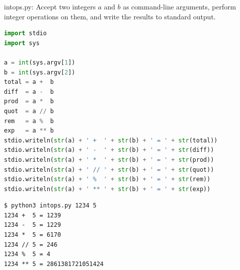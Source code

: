 \documentclass[8pt,a4paper,compress]{beamer}
\begin{document}
\begin{frame}[fragile]
\pause

\begin{framed}
\tiny intops.py: Accept two integers $a$ and $b$ as command-line arguments, perform integer operations on them, and write the results to standard output.
\end{framed}

\begin{lstlisting}[language=Python,style=focusin]
import stdio
import sys

a = int(sys.argv[1])
b = int(sys.argv[2])
total = a +  b
diff  = a -  b
prod  = a *  b
quot  = a // b
rem   = a %  b
exp   = a ** b
stdio.writeln(str(a) + ' +  ' + str(b) + ' = ' + str(total))
stdio.writeln(str(a) + ' -  ' + str(b) + ' = ' + str(diff))
stdio.writeln(str(a) + ' *  ' + str(b) + ' = ' + str(prod))
stdio.writeln(str(a) + ' // ' + str(b) + ' = ' + str(quot))
stdio.writeln(str(a) + ' %  ' + str(b) + ' = ' + str(rem))
stdio.writeln(str(a) + ' ** ' + str(b) + ' = ' + str(exp))
\end{lstlisting}

\pause\bigskip

\begin{lstlisting}[language={},style=focusin]
$ python3 intops.py 1234 5
1234 +  5 = 1239
1234 -  5 = 1229
1234 *  5 = 6170
1234 // 5 = 246
1234 %  5 = 4
1234 ** 5 = 2861381721051424
\end{lstlisting}
\end{frame}
\end{document}
